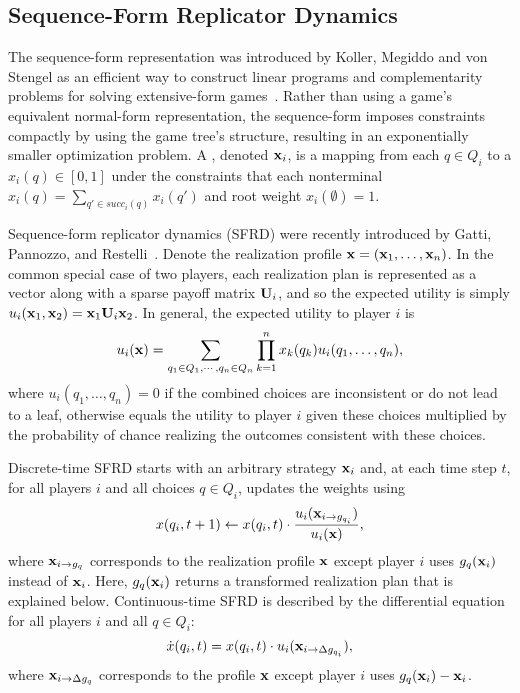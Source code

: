 \documentclass{aamas2014}
\begin{document}
\subsection{Sequence-Form Replicator Dynamics}


The sequence-form representation was introduced by Koller, Megiddo and von Stengel as an efficient way to construct
linear programs and complementarity problems for solving extensive-form games~\cite{SequenceFormLPs}. Rather than using a
game's equivalent normal-form representation, the sequence-form imposes constraints compactly by using the game tree's structure, 
resulting in an exponentially smaller optimization problem.
A , denoted $\mathbf{x}_i$, is a mapping from each $q \in Q_i$ to a  
$x_i(q) \in [0,1]$ under the constraints that each nonterminal $x_i(q) = \sum_{q' \in succ_i(q)} x_i(q')$ and root weight $x_i(\emptyset) = 1$. 

Sequence-form replicator dynamics (SFRD) were recently introduced by Gatti, Pannozzo, and Restelli~\cite{Gatti13Efficient}. 
Denote the realization profile $\mathbf{x} = (\mathbf{x}_1, \ldots, \mathbf{x}_n)$. 
In the common special case of two players, each realization plan is represented as a vector along with a sparse payoff matrix $\mathbf{U}_i$, 
and so the expected utility is simply $u_i(\mathbf{x}_1, \mathbf{x}_2) = \mathbf{x}_1 \mathbf{U}_i \mathbf{x}_2$. 
In general, the expected utility to player $i$ is  
\[
u_i(\mathbf{x}) = \sum_{q_1 \in Q_1, \cdots, q_n \in Q_n} \prod_{k=1}^n x_k(q_k) u_i(q_1, \ldots, q_n),
\]
where $u_i(q_1, \ldots, q_n) = 0$ if the combined choices are inconsistent or do not lead to a leaf, otherwise 
equals the utility to player $i$ given these choices multiplied by the probability of chance realizing the outcomes 
consistent with these choices. 

Discrete-time SFRD starts with an arbitrary strategy $\mathbf{x}_i$ and, at each time step $t$, for all players $i$ and all 
choices $q \in Q_i$, updates the weights using
\begin{equation}
x(q_i,t+1) \leftarrow x(q_i,t) \cdot \frac{u_i(\mathbf{x}_{i \rightarrow g_{q_i}})}{u_i(\mathbf{x})},
\end{equation}
where $\mathbf{x}_{i \rightarrow g_q}$ corresponds to the realization profile $\mathbf{x}$ except player $i$ uses $g_q(\mathbf{x}_i)$ instead of $\mathbf{x}_i$. 
Here, $g_q(\mathbf{x}_i)$ returns a transformed realization plan that is explained below. 
Continuous-time SFRD is described by the differential equation for all players $i$ and all $q \in Q_i$:
\begin{equation}
\dot{x}(q_i,t) = x(q_i,t) \cdot u_i(\mathbf{x}_{i \rightarrow \Delta g_{q_i}}),
\end{equation}
where $\mathbf{x}_{i \rightarrow \Delta g_q}$ corresponds to the profile $\mathbf{x}$ except player $i$ uses $g_q(\mathbf{x}_i) - \mathbf{x}_i$. 
\end{document}
